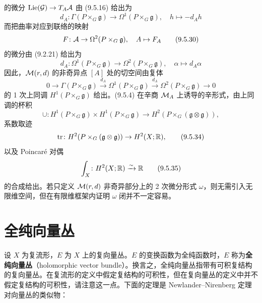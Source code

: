 的微分 $\operatorname{Lie}(\mathcal{G})\to T_A\mathcal{A}$ 由 (9.5.16) 给出为
\begin{equation}
  d_A\colon \Gamma(P\times_G\mathfrak{g})\to\Omega^1(P\times_G\mathfrak{g}),\quad
  h\mapsto -d_A h
  \tag{9.5.29}
\end{equation}
而把曲率对应到联络的映射
\begin{equation}
  F\colon \mathcal{A}\to\Omega^2(P\times_G\mathfrak{g}),\quad A\mapsto F_A
  \tag{9.5.30}
\end{equation}
的微分由 (9.2.21) 给出为
\begin{equation}
  d_A\colon \Omega^1(P\times_G\mathfrak{g})\to\Omega^2(P\times_G\mathfrak{g}),\quad
  \alpha\mapsto d_A\alpha
  \tag{9.5.31}
\end{equation}
因此，$\mathcal{M}(r,d)$ 的非奇异点 $[A]$ 处的切空间由复体
\begin{equation}
  0 \to \Gamma(P\times_G\mathfrak{g}) \xrightarrow{d_A}
  \Omega^1(P\times_G\mathfrak{g}) \xrightarrow{d_A}
  \Omega^2(P\times_G\mathfrak{g}) \to 0
  \tag{9.5.32}
\end{equation}
的 1 次上同调 $H^1(P\times_G\mathfrak{g})$ 给出。(9.5.4) 在辛商 $\mathcal{M}_A$ 上诱导的辛形式，由上同调的杯积
\begin{equation}
  \cup\colon H^1(P\times_G\mathfrak{g})\times H^1(P\times_G\mathfrak{g})
  \to H^2(P\times_G(\mathfrak{g}\otimes\mathfrak{g})),
  \tag{9.5.33}
\end{equation}
系数取迹
\begin{equation}
  \operatorname{tr}\colon H^2(P\times_G(\mathfrak{g}\otimes\mathfrak{g}))\to H^2(X;\mathbb{R}),
  \tag{9.5.34}
\end{equation}
以及 Poincaré 对偶
\begin{equation}
  \int_X\colon H^2(X;\mathbb{R})\xrightarrow{\sim}\mathbb{R}
  \tag{9.5.35}
\end{equation}
的合成给出。若只定义 $\mathcal{M}(r,d)$ 非奇异部分上的 2 次微分形式 $\omega$，则无需引入无限维空间，但在有限维框架内证明 $\omega$ 闭并不一定容易。


\section{全纯向量丛}

设 $X$ 为复流形，$E$ 为 $X$ 上的复向量丛。$E$ 的变换函数为全纯函数时，$E$ 称为\textbf{全纯向量丛}（holomorphic vector bundle）。换言之，全纯向量丛指带有可积复结构的复向量丛。在复流形的定义中假定复结构的可积性，但在复向量丛的定义中并不假定复结构的可积性，请注意这一点。下面的定理是 Newlander--Nirenberg 定理对向量丛的类似物：

